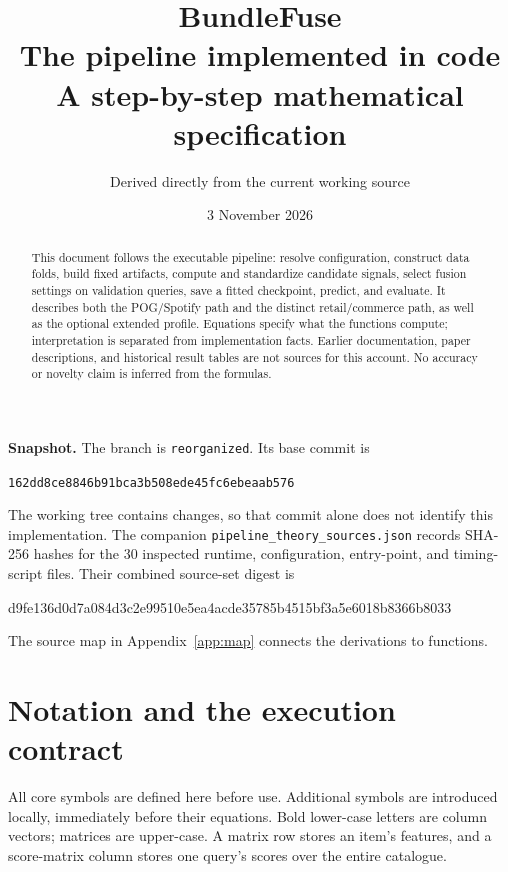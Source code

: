 \documentclass[11pt,a4paper]{article}
\title{\textcolor{inkblue}{BundleFuse}\\[5pt]
 The pipeline implemented in code\\[7pt]
 \large A step-by-step mathematical specification}
\author{Derived directly from the current working source}
\date{3 November 2026}
\newcommand{\code}[1]{\nolinkurl{#1}}
\numberwithin{equation}{section}
\begin{document}
\maketitle
\begin{abstract}
This document follows the executable pipeline: resolve configuration, construct data folds,
build fixed artifacts, compute and standardize candidate signals, select fusion settings on
validation queries, save a fitted checkpoint, predict, and evaluate. It describes both the
POG/Spotify path and the distinct retail/commerce path, as well as the optional extended
profile. Equations specify what the functions compute; interpretation is separated from
implementation facts. Earlier documentation, paper descriptions, and historical result tables
are not sources for this account. No accuracy or novelty claim is inferred from the formulas.
\end{abstract}

\textbf{Snapshot.} The branch is \code{reorganized}. Its base commit is
\begin{center}\code{162dd8ce8846b91bca3b508ede45fc6ebeaab576}\end{center}
The working tree contains changes,
so that commit alone does not identify this implementation. The companion
\code{pipeline_theory_sources.json} records SHA-256 hashes for the 30 inspected runtime,
configuration, entry-point, and timing-script files. Their combined source-set digest is
\begin{center}\small\ttfamily d9fe136d0d7a084d3c2e99510e5ea4acde35785b4515bf3a5e6018b8366b8033\end{center}
The source map in Appendix~\ref{app:map} connects the derivations to functions.

\clearpage
\tableofcontents
\clearpage

\section*{Notation and the execution contract}
\label{sec:notation}
All core symbols are defined here before use. Additional symbols are introduced locally,
immediately before their equations. Bold lower-case letters are column vectors; matrices
are upper-case. A matrix row stores an item's features, and a score-matrix column stores
one query's scores over the entire catalogue.
\end{document}
